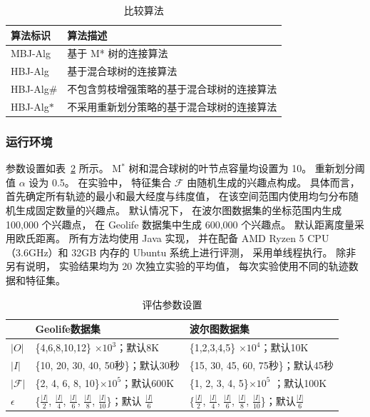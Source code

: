 \begin{table}[!ht]
    \caption{比较算法}\label{join_tb:compared_alg}
    \begin{tabular}{ll}
        \toprule
		\bfseries 算法标识 & \bfseries 算法描述 \\
        \midrule
        MBJ-Alg & 基于 M* 树的连接算法\\
        HBJ-Alg & 基于混合球树的连接算法 \\
        HBJ-Alg\# & 不包含剪枝增强策略的基于混合球树的连接算法 \\
        HBJ-Alg$*$ &不采用重新划分策略的基于混合球树的连接算法\\
        \bottomrule
    \end{tabular}
\end{table}




\subsubsection*{运行环境}
参数设置如表~\ref{tb:algorithm_para} 所示。 M$^\ast$ 树和混合球树的叶节点容量均设置为 10。 重新划分阈值 $\alpha$ 设为 0.5。 在实验中， 特征集合 $\mathcal{F}$ 由随机生成的兴趣点构成。 具体而言， 首先确定所有轨迹的最小和最大经度与纬度值， 在该空间范围内使用均匀分布随机生成固定数量的兴趣点。 默认情况下， 在波尔图数据集的坐标范围内生成 100,000 个兴趣点， 在 Geolife 数据集中生成 600,000 个兴趣点。 默认距离度量采用欧氏距离。 所有方法均使用 Java 实现， 并在配备 AMD Ryzen 5 CPU（3.6GHz）和 32GB 内存的 Ubuntu 系统上进行评测， 采用单线程执行。 除非另有说明， 实验结果均为 20 次独立实验的平均值， 每次实验使用不同的轨迹数据和特征集。
\begin{table}[!ht]
    \caption{评估参数设置}\label{tb:algorithm_para}
    \begin{tabular}{l|ll}
	\toprule
		&\textbf{Geolife数据集}&\textbf{波尔图数据集}\\
	\midrule
        $|O|$ & \{4,6,8,10,12\} $\times 10^3$；默认8K  & \{1,2,3,4,5\} $\times 10^4$；默认10K \\
        $|I|$ & \{10, 20, 30, 40, 50秒\}；默认30秒  & \{15,  30, 45, 60, 75秒\}；默认45秒 \\
        $|\mathcal{F}|$ & \{2, 4, 6, 8, 10\}$\times 10^5$；默认600K  & \{1, 2, 3, 4, 5\}$\times 10^5$ ；默认100K \\
        $\epsilon$ & \{$\frac{|I|}{2}$,   $\frac{|I|}{4}$, $\frac{|I|}{6}$, $\frac{|I|}{8}$, $\frac{|I|}{10}$\}；默认 $\frac{|I|}{6}$   & \{$\frac{|I|}{2}$,   $\frac{|I|}{4}$, $\frac{|I|}{6}$, $\frac{|I|}{8}$, $\frac{|I|}{10}$\}；默认$\frac{|I|}{6}$ \\
\bottomrule
    \end{tabular}

\end{table}


